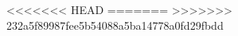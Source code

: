 \documentclass[12pt]{book}
\begin{document}




\pagestyle{fancy}

% 
% 
% 
% 
% 
% 
% 

% 
% 
% 
% 
% 
% 
% 
% 

% 
% 
% 
% 

% 
% 
% 
% 
% 
% 
% 

% 
% 
% 
% 
% 
% 
% 
% 
<<<<<<< HEAD
=======
% 
% 
>>>>>>> 232a5f89987fee5b54088a5ba14778a0fd29fbdd

\end{document}
